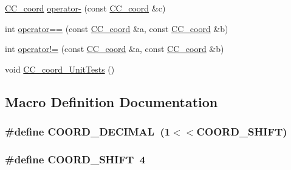 \begin{DoxyCompactItemize}
\item 
\hyperlink{a00029}{C\-C\-\_\-coord} \hyperlink{a00204_a5206d2ba411bff4c7511d6cfe56e2233}{operator-\/} (const \hyperlink{a00029}{C\-C\-\_\-coord} \&c)
\item 
int \hyperlink{a00204_ab2dfda1e48361ee1f727d3e928d52084}{operator==} (const \hyperlink{a00029}{C\-C\-\_\-coord} \&a, const \hyperlink{a00029}{C\-C\-\_\-coord} \&b)
\item 
int \hyperlink{a00204_a0bfddf1fee7cc24a1698c2b20320ba2b}{operator!=} (const \hyperlink{a00029}{C\-C\-\_\-coord} \&a, const \hyperlink{a00029}{C\-C\-\_\-coord} \&b)
\item 
void \hyperlink{a00204_a6014cc2d64702c71dff02ed2f3feca4d}{C\-C\-\_\-coord\-\_\-\-Unit\-Tests} ()
\end{DoxyCompactItemize}


\subsection{Macro Definition Documentation}
\hypertarget{a00204_a3936069d2674cf5df63477c89b7fbbf1}{
\subsubsection[{C\-O\-O\-R\-D\-\_\-\-D\-E\-C\-I\-M\-A\-L}]{\setlength{\rightskip}{0pt plus 5cm}\#define C\-O\-O\-R\-D\-\_\-\-D\-E\-C\-I\-M\-A\-L~(1$<$$<${\bf C\-O\-O\-R\-D\-\_\-\-S\-H\-I\-F\-T})}}\label{a00204_a3936069d2674cf5df63477c89b7fbbf1}
\hypertarget{a00204_a89a0ee45e3c08aa1a91983e887504e6a}{
\subsubsection[{C\-O\-O\-R\-D\-\_\-\-S\-H\-I\-F\-T}]{\setlength{\rightskip}{0pt plus 5cm}\#define C\-O\-O\-R\-D\-\_\-\-S\-H\-I\-F\-T~4}}\label{a00204_a89a0ee45e3c08aa1a91983e887504e6a}


